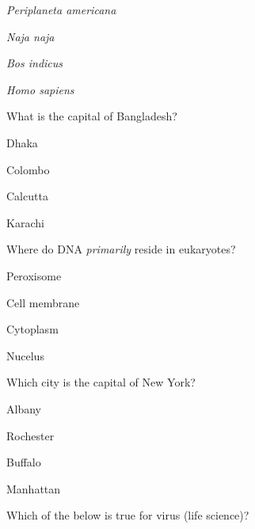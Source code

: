 \documentclass[12pt]{exam}
\begin{document}
\begin{questions}
\begin{oneparchoices}
            \choice \textit{Periplaneta americana}
        
            \choice \textit{Naja naja}
        
            \choice \textit{Bos indicus}
        
            \choice \textit{Homo sapiens}
        
        \end{oneparchoices}

    \question What is the capital of Bangladesh?
    
        \begin{oneparchoices}
        
            \choice Dhaka
        
            \choice Colombo
        
            \choice Calcutta
        
            \choice Karachi
        
        \end{oneparchoices}

    \question Where do DNA \textit{primarily} reside in eukaryotes?
    
        \begin{oneparchoices}
        
            \choice Peroxisome
        
            \choice Cell membrane
        
            \choice Cytoplasm
        
            \choice Nucelus
        
        \end{oneparchoices}

    \question Which city is the capital of New York?
    
        \begin{oneparchoices}
        
            \choice Albany
        
            \choice Rochester
        
            \choice Buffalo
        
            \choice Manhattan
        
        \end{oneparchoices}

    \question Which of the below is true for virus (life science)?
    
        \begin{oneparchoices}
        

\end{oneparchoices}
\end{questions}
\end{document}
